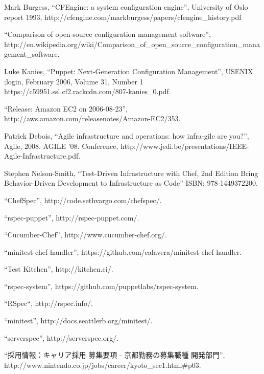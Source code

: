 Mark Burgess, ``CFEngine: a system configuration engine'',
University of Oslo report 1993,
http://cfengine.com/markburgess/papers/cfengine\_history.pdf

``Comparison of open-source configuration management software'',
http://en.wikipedia.org/wiki/Comparison\_of\_open\_source\_configuration\_management\_software.

Luke Kanies,
``Puppet: Next-Generation Configuration Management'',
USENIX ;login, February 2006, Volume 31, Number 1
https://c59951.ssl.cf2.rackcdn.com/807-kanies\_0.pdf.

``Release: Amazon EC2 on 2006-08-23'',
http://aws.amazon.com/releasenotes/Amazon-EC2/353.

Patrick Debois,
``Agile infrastructure and operations: how infra-gile are you?'',
Agile, 2008. AGILE '08. Conference,
http://www.jedi.be/presentations/IEEE-Agile-Infrastructure.pdf.

Stephen Nelson-Smith,
``Test-Driven Infrastructure with Chef, 2nd Edition
Bring Behavior-Driven Development to Infrastructure as Code''
ISBN: 978-1449372200.

``ChefSpec'', http://code.sethvargo.com/chefspec/.

``rspec-puppet'', http://rspec-puppet.com/.

``Cucumber-Chef'', http://www.cucumber-chef.org/.

``minitest-chef-handler'', https://github.com/calavera/minitest-chef-handler.

``Test Kitchen'', http://kitchen.ci/.

``rspec-system'', https://github.com/puppetlabs/rspec-system.

``RSpec``, http://rspec.info/.

``minitest'', http://docs.seattlerb.org/minitest/.

``serverspec'', http://serverspec.org/.

``採用情報：キャリア採用 募集要項 - 京都勤務の募集職種 開発部門'',
http://www.nintendo.co.jp/jobs/career/kyoto\_sec1.html\#p03.

